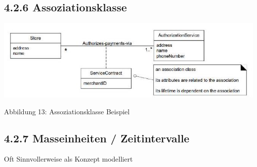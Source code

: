 \subsection*{4.2.6 Assoziationsklasse}
\begin{center}
\includegraphics[width=\linewidth]{images/2024_12_29_0d1d7b5551ea1b4b41bdg-07}
\end{center}

Abbildung 13: Assoziationsklasse Beispiel

\subsection*{4.2.7 Masseinheiten / Zeitintervalle}
Oft Sinnvollerweise als Konzept modelliert
